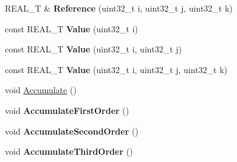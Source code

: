 \begin{DoxyCompactItemize}
\item 
\hypertarget{classatl_1_1_tape_a507c33a9c2f85a5229042bc635699e44}{R\+E\+A\+L\+\_\+\+T \& {\bfseries Reference} (uint32\+\_\+t i, uint32\+\_\+t j, uint32\+\_\+t k)}\label{classatl_1_1_tape_a507c33a9c2f85a5229042bc635699e44}

\item 
\hypertarget{classatl_1_1_tape_a69f08d0d927e3be29969cfada0b498d5}{const R\+E\+A\+L\+\_\+\+T {\bfseries Value} (uint32\+\_\+t i)}\label{classatl_1_1_tape_a69f08d0d927e3be29969cfada0b498d5}

\item 
\hypertarget{classatl_1_1_tape_a362fe066cd6b4ae9ddfde320feebc206}{const R\+E\+A\+L\+\_\+\+T {\bfseries Value} (uint32\+\_\+t i, uint32\+\_\+t j)}\label{classatl_1_1_tape_a362fe066cd6b4ae9ddfde320feebc206}

\item 
\hypertarget{classatl_1_1_tape_a8e16f61e76688105fb8aeb25ebfbeeaf}{const R\+E\+A\+L\+\_\+\+T {\bfseries Value} (uint32\+\_\+t i, uint32\+\_\+t j, uint32\+\_\+t k)}\label{classatl_1_1_tape_a8e16f61e76688105fb8aeb25ebfbeeaf}

\item 
void \hyperlink{classatl_1_1_tape_a5466d55b5e2f3a463bbbe6521cf49359}{Accumulate} ()
\item 
\hypertarget{classatl_1_1_tape_af0d63ed0c151614290bae44e5d7b07cb}{void {\bfseries Accumulate\+First\+Order} ()}\label{classatl_1_1_tape_af0d63ed0c151614290bae44e5d7b07cb}

\item 
\hypertarget{classatl_1_1_tape_a9d12d59ac03929ec8a5d05d14bad9a68}{void {\bfseries Accumulate\+Second\+Order} ()}\label{classatl_1_1_tape_a9d12d59ac03929ec8a5d05d14bad9a68}

\item 
\hypertarget{classatl_1_1_tape_a2aece965b7b72ee6a9b7789da7c41006}{void {\bfseries Accumulate\+Third\+Order} ()}\label{classatl_1_1_tape_a2aece965b7b72ee6a9b7789da7c41006}

\end{DoxyCompactItemize}
